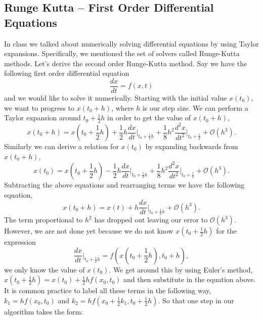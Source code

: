 \documentclass{article}
\begin{document}
\subsection{Runge Kutta -- First Order Differential Equations}
In class we talked about numerically solving differential equations by using Taylor expansions. Specifically, we mentioned the set of solvers called Runge-Kutta methods. Let's derive the second order Runge-Kutta method. Say we have the following first order differential equation
\begin{equation*}
\frac{dx}{dt} = f(x,t)
\end{equation*}
and we would like to solve it numerically. Starting with the initial value $x\left(t_0\right)$, we want to progress to $x\left(t_0 + h\right)$, where $h$ is our step size. We can perform a Taylor expansion around $t_0+\frac{1}{2}h$ in order to get the value of $x\left(t_0+h\right)$,
\begin{equation*}
x\left(t_0+h\right) = x(t_0+\frac{1}{2}h) + \frac{1}{2}h\frac{dx}{dt}\bigg|_{t_0+\frac{1}{2}h}+\frac{1}{8}h^2\frac{d^2x}{dt^2}\bigg|_{t_0+\frac{1}{2}} + \mathcal{O}\left(h^3\right).
\end{equation*} 
Similarly we can derive a relation for $x\left(t_0\right)$ by expanding backwards from $x\left(t_0+h\right)$,
\begin{equation*}
x\left(t_0\right) = x(t_0+\frac{1}{2}h) - \frac{1}{2}h\frac{dx}{dt}\bigg|_{t_0+\frac{1}{2}h}+\frac{1}{8}h^2\frac{d^2x}{dt^2}\bigg|_{t_0+\frac{1}{2}} + \mathcal{O}\left(h^3\right).
\end{equation*} 
Subtracting the above equations and rearranging terms we have the following equation,
\begin{equation*}
x\left(t_0+h\right) = x\left(t\right) + h\frac{dx}{dt}\bigg|_{t_0+\frac{1}{2}h} + \mathcal{O}\left(h^3\right).
\end{equation*}
The term proportional to $h^2$ has dropped out leaving our error to $\mathcal{O}\left(h^3\right)$. However, we are not done yet because we do not know $x\left(t_0+\frac{1}{2}h\right)$ for the expression
\begin{equation*}
\frac{dx}{dt}\bigg|_{t_0+\frac{1}{2}h} = f\left(x(t_0+\frac{1}{2}h), t_0+h\right),
\end{equation*}
we only know the value of $x\left(t_0\right)$. We get around this by using Euler's method, $x(t_0+\frac{1}{2}h) = x(t_0) + \frac{1}{2}hf(x_0, t_0)$ and then substitute in the equation above. It is common practice to label all these terms in the following way, $k_1 = hf(x_0, t_0)$ and $k_2 = hf(x_0+\frac{1}{2}k_1, t_0 + \frac{1}{2}h)$. So that one step in our algorithm takes the form:
\end{document}
